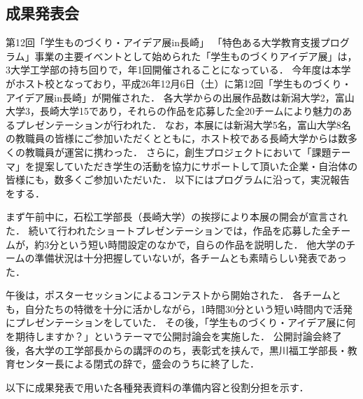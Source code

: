 \subsection{成果発表会}
\par
第12回「学生ものづくり・アイデア展in長崎」
「特色ある大学教育支援プログラム」事業の主要イベントとして始められた「学生ものづくりアイデア展」は，3大学工学部の持ち回りで，年1回開催されることになっている．
今年度は本学がホスト校となっており，平成26年12月6日（土）に第12回「学生ものづくり・アイデア展in長崎」が開催された．
各大学からの出展作品数は新潟大学2，富山大学3，長崎大学15であり，それらの作品を応募した全20チームにより魅力のあるプレゼンテーションが行われた．
なお，本展には新潟大学5名，富山大学8名の教職員の皆様にご参加いただくとともに，ホスト校である長崎大学からは数多くの教職員が運営に携わった．
さらに，創生プロジェクトにおいて「課題テーマ」を提案していただき学生の活動を協力にサポートして頂いた企業・自治体の皆様にも，数多くご参加いただいた．
以下にはプログラムに沿って，実況報告をする．
\par
まず午前中に，石松工学部長（長崎大学）の挨拶により本展の開会が宣言された．
続いて行われたショートプレゼンテーションでは，作品を応募した全チームが，約3分という短い時間設定のなかで，自らの作品を説明した．
他大学のチームの準備状況は十分把握していないが，各チームとも素晴らしい発表であった．
\par
午後は，ポスターセッションによるコンテストから開始された．
各チームとも，自分たちの特徴を十分に活かしながら，1時間30分という短い時間内で活発にプレゼンテーションをしていた．
その後，「学生ものづくり・アイデア展に何を期待しますか？」というテーマで公開討論会を実施した．
公開討論会終了後，各大学の工学部長からの講評ののち，表彰式を挟んで，黒川福工学部長・教育センター長による閉式の辞で，盛会のうちに終了した．
\par
以下に成果発表で用いた各種発表資料の準備内容と役割分担を示す．
